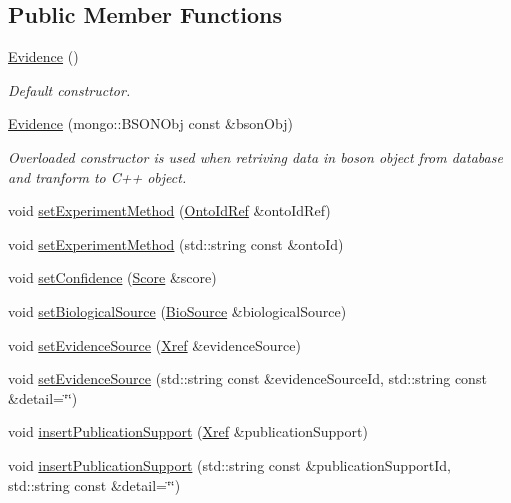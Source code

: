 \subsection*{Public Member Functions}
\begin{DoxyCompactItemize}
\item 
\hyperlink{classunisys_1_1Evidence_ae8c055dcc1043da7a655487931f67864}{Evidence} ()
\begin{DoxyCompactList}\small\item\em Default constructor. \end{DoxyCompactList}\item 
\hyperlink{classunisys_1_1Evidence_ab349472863abf438f40c5f2f089281ac}{Evidence} (mongo\-::\-B\-S\-O\-N\-Obj const \&bson\-Obj)
\begin{DoxyCompactList}\small\item\em Overloaded constructor is used when retriving data in boson object from database and tranform to C++ object. \end{DoxyCompactList}\item 
void \hyperlink{classunisys_1_1Evidence_a6b74b64b25249e38e9b2524c8882adca}{set\-Experiment\-Method} (\hyperlink{classunisys_1_1OntoIdRef}{Onto\-Id\-Ref} \&onto\-Id\-Ref)
\item 
void \hyperlink{classunisys_1_1Evidence_a10bdc5b89865dea993dde0782270c836}{set\-Experiment\-Method} (std\-::string const \&onto\-Id)
\item 
void \hyperlink{classunisys_1_1Evidence_a9bc4f40a58aae2b0fafc73ed0d647d5a}{set\-Confidence} (\hyperlink{classunisys_1_1Score}{Score} \&score)
\item 
void \hyperlink{classunisys_1_1Evidence_a7cbfcbc96a2364d268012c09df1e6eca}{set\-Biological\-Source} (\hyperlink{classunisys_1_1BioSource}{Bio\-Source} \&biological\-Source)
\item 
void \hyperlink{classunisys_1_1Evidence_a3d9c295abcdaf773621427536d742b8b}{set\-Evidence\-Source} (\hyperlink{classunisys_1_1Xref}{Xref} \&evidence\-Source)
\item 
void \hyperlink{classunisys_1_1Evidence_a5bf3367415dbe2e37dfcff827101c65d}{set\-Evidence\-Source} (std\-::string const \&evidence\-Source\-Id, std\-::string const \&detail=\char`\"{}\char`\"{})
\item 
void \hyperlink{classunisys_1_1Evidence_ac3ecf7240bc24d235f2ee1226e9be83e}{insert\-Publication\-Support} (\hyperlink{classunisys_1_1Xref}{Xref} \&publication\-Support)
\item 
void \hyperlink{classunisys_1_1Evidence_a16f5abbb62d6231681b74244d8060cb8}{insert\-Publication\-Support} (std\-::string const \&publication\-Support\-Id, std\-::string const \&detail=\char`\"{}\char`\"{})
\end{DoxyCompactItemize}
